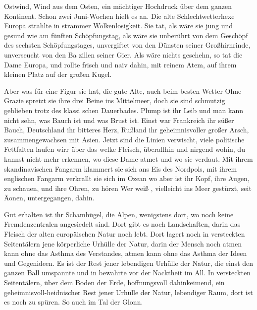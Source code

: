 

Ostwind, Wind aus dem Osten, ein mächtiger Hochdruck über
dem ganzen Kontinent. Schon zwei Juni-Wochen hielt es an.
Die alte Schlechtwetterhexe Europa strahlte in strammer
Wolkenlosigkeit. Sie tat, als wäre sie jung und ge\-sund wie
am fünften Schöpfungstag, als wäre sie unberührt von dem
Geschöpf des sechsten Schöpfungstages, unvergiftet von den
Dünsten seiner Großhirnrinde, unverseucht von den Ba\-%
zillen seiner Gier. Als wäre nichts geschehn, so tat die Dame
Europa, und rollte frisch und naiv dahin, mit reinem Atem,
auf ihrem kleinen Platz auf der großen Kugel.

Aber was für eine Figur sie hat, die gute Alte, auch beim
besten Wetter\ausr{} Ohne Grazie spreizt sie ihre drei Beine ins
Mittelmeer, doch sie sind schmutzig geblieben trotz des klassi\-%
schen Dauerbades. Plump ist ihr Leib und man kann nicht
sehn, was Bauch ist und was Brust ist. Einst war Frankreich
ihr süßer Bauch, Deutschland ihr bitteres Herz, Rußland ihr
geheimnisvoller großer Arsch, zusammengewachsen mit Asien.
Jetzt sind die Linien verwischt, viele politische Fettfalten
laufen wirr über das welke Fleisch, überallhin und nirgend\-%
wohin, du kannst nicht mehr erkennen, wo diese Dame atmet
und wo sie verdaut. Mit ihrem skandinavischen Fangarm
klammert sie sich ans Eis des Nordpols, mit ihrem englischen
Fangarm verkrallt sie sich im Ozean\dopp{} wo aber ist ihr Kopf,
ihre Augen, zu schauen, und ihre Ohren, zu hören\frag{} Wer weiß%
\eingriff{S7-1}{weiß, ] weiß},
vielleicht ins Meer gestürzt, seit Äonen, untergegangen,
dahin.

Gut erhalten ist ihr Schamhügel, die Alpen, wenigstens dort,
wo noch keine Fremdenzentralen angesiedelt sind. Dort gibt
es noch Landschaften, darin das Fleisch der alten europäischen
Natur noch lebt. Dort lagert noch in versteckten Seitentälern
jene körperliche Urhülle der Natur, darin der Mensch noch
atmen kann ohne das Asthma des Verstandes, atmen kann
ohne das Asthma der Ideen und Gegenideen. Es ist der Rest
jener lebendigen Urhülle der Natur, die einst den ganzen
Ball umspannte und in bewahrte vor der Nacktheit im All.
In versteckten Seitentälern, über dem Boden der Erde,
hoffnungsvoll dahinkeimend, ein geheimnisvoll-heidnischer
Rest jener Urhülle der Natur, lebendiger Raum, dort ist es
noch zu spüren. So auch im Tal der Glonn.

